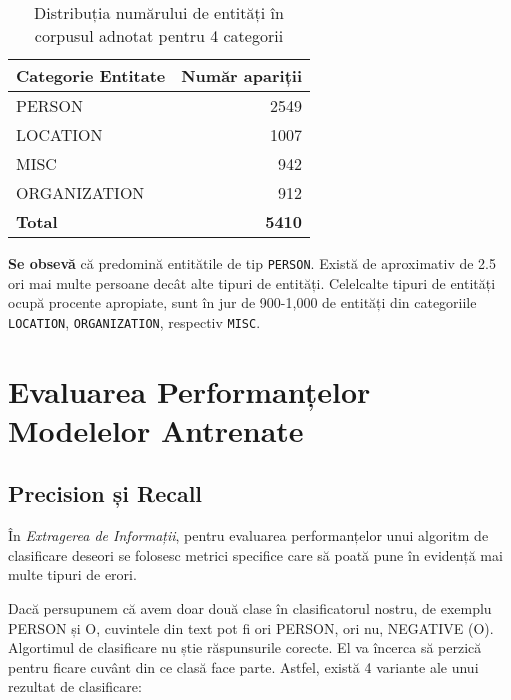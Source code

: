 \begin{center}
\begin{table}[htb]
  \caption{Distribuția numărului de entități în corpusul adnotat pentru 4 categorii}
  \begin{tabular}{|l|r|}
  \hline
   Categorie Entitate & Număr apariții\\
   \hline
  PERSON	&	2549	\\
  LOCATION	&	1007	\\
  MISC	&	942	\\
  ORGANIZATION	&	912	\\
   \hline
   \textbf{Total} 	&	\textbf{5410} \\
   \hline
   
  \end{tabular}
  \label{table:top-entites-4-categories}
\end{table}
\end{center}




\textbf{Se obsevă} că predomină entitătile de tip \texttt{PERSON}. Există de aproximativ de 2.5 ori mai multe persoane decât alte tipuri de entități. Celelcalte tipuri de entități ocupă procente apropiate, sunt în jur de 900-1,000 de entități din categoriile \texttt{LOCATION}, \texttt{ORGANIZATION}, respectiv \texttt{MISC}.

\section{Evaluarea Performanțelor Modelelor Antrenate}
\label{sec:model-measurements}

\subsection{Precision și Recall}
\label{subsec:precision-and-recall}

În\textit{ Extragerea de Informații}, pentru evaluarea performanțelor unui algoritm de clasificare deseori se folosesc metrici specifice care să poată pune în evidență mai multe tipuri de erori.

Dacă persupunem că avem doar două clase în clasificatorul nostru, de exemplu PERSON și O, cuvintele din text pot fi ori PERSON, ori nu, NEGATIVE (O). Algortimul de clasificare nu știe răspunsurile corecte. El va încerca să perzică pentru ficare cuvânt din ce clasă face parte. Astfel, există 4 variante ale unui rezultat de clasificare:


